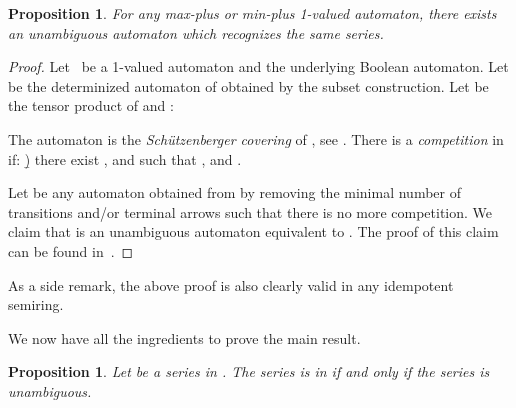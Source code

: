 \documentclass{article}
\newtheorem{prpstn}[thrm]{Proposition}
\newcommand{\1}{\mathbb{1}}
\newcommand{\0}{\mathbb{0}}
\begin{document}
\begin{prpstn}\label{pr-weber}
For any max-plus or min-plus 1-valued automaton, there exists 
an unambiguous automaton which recognizes the same series.
\end{prpstn}

\begin{proof}
Let~ be a 1-valued automaton and  the underlying
Boolean automaton.
 Let  be the determinized automaton of
  obtained by the subset construction. Let
  be the tensor product of  and :
 
The automaton  is the {\em Sch\"{u}tzenberger covering} of ,
see \cite{saka98}. 
There is a {\it competition} in  if:
\b) there exist ,  and  such that ,
   and .

Let  be  any automaton obtained from  by
removing the minimal number of transitions and/or terminal arrows such
that there is no more competition. 
We claim that  is an unambiguous automaton equivalent to .
The proof of this claim
can be found in~\cite[Section 4]{KLMP04}.
\end{proof}

As a side remark, the above proof is also clearly valid in any idempotent semiring. 

\medskip

We now have all the ingredients to prove the main result. 

\begin{prpstn}
\label{pr-maxmin2}
Let   be a series in . The series  is in
 if and only if the series  is unambiguous. 
\end{prpstn}
\end{document}
